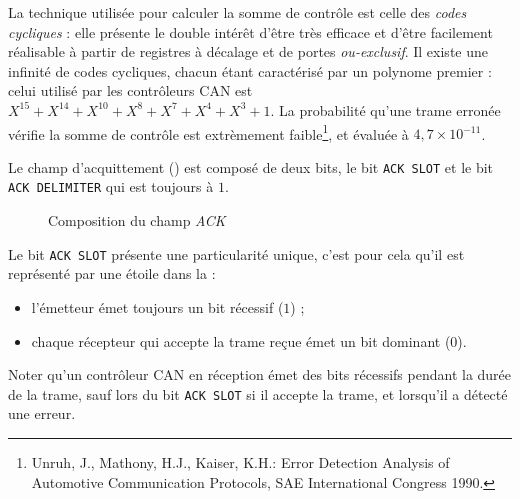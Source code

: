 La technique utilisée pour calculer la somme de contrôle est celle des \emph{codes cycliques} : elle présente le double intérêt d'être très efficace et d'être facilement réalisable à partir de registres à décalage et de portes \emph{ou-exclusif}. Il existe une infinité de codes cycliques, chacun étant caractérisé par un polynome premier : celui utilisé par les contrôleurs CAN est $X^{15}+X^{14}+X^{10}+X^8+X^7+X^4+X^3+1$. La probabilité qu'une trame erronée vérifie la somme de contrôle est extrèmement faible\footnote{Unruh, J., Mathony, H.J., Kaiser, K.H.: Error Detection Analysis of Automotive Communication Protocols, SAE International Congress 1990.}, et évaluée à $4,7 \times 10^{-11}$.





Le champ d'acquittement () est composé de deux bits, le bit \texttt{ACK SLOT} et le bit \texttt{ACK DELIMITER} qui est toujours à $1$.

\begin{figure}[h]
  \centering
  \caption{Composition du champ \emph{ACK}}
\end{figure}

Le bit \texttt{ACK SLOT} présente une particularité unique, c'est pour cela qu'il est représenté par une étoile dans la  :
\begin{itemize}
  \item l'émetteur émet toujours un bit récessif ($1$) ;
  \item chaque récepteur qui accepte la trame reçue émet un bit dominant ($0$).
\end{itemize}

Noter qu'un contrôleur CAN en réception émet des bits récessifs pendant la durée de la trame, sauf lors du bit \texttt{ACK SLOT} si il accepte la trame, et lorsqu'il a détecté une erreur.

